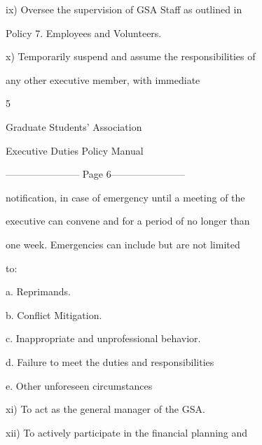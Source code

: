   

         ix)      Oversee  the  supervision  of  GSA  Staff  as  outlined  in  



                  Policy 7. Employees and Volunteers.   

  

         x)       Temporarily  suspend  and  assume  the  responsibilities  of  

                  any       other       executive         member,          with       immediate  



                                                  5  

                                      

                                    Graduate Students’ Association  

                                   Executive Duties Policy Manual  

  


----------------------- Page 6-----------------------

                   notification, in case of emergency until a meeting of the  

                   executive can convene and for a period of no longer than  

                   one  week.  Emergencies  can  include  but  are  not  limited  

                   to:   

  

                            a. Reprimands.   

  

                            b. Conflict Mitigation.   

  

                            c. Inappropriate and unprofessional behavior.   

  

                            d. Failure to meet the duties and responsibilities   

  

                            e. Other unforeseen circumstances   

  

         xi)       To act as the general manager of the GSA.   

  

         xii)      To  actively  participate  in  the  financial  planning  and  

